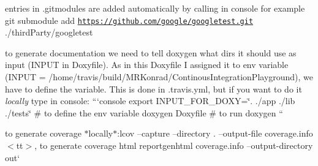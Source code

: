 \begin{DoxyItemize}
\item entries in {\ttfamily .gitmodules} are added automatically by calling in console for example {\ttfamily git submodule add \href{https://github.com/google/googletest.git}{\tt https\-://github.\-com/google/googletest.\-git} ./third\-Party/googletest}
\begin{DoxyItemize}
\item to generate documentation we need to tell doxygen what dirs it should use as input ({\ttfamily I\-N\-P\-U\-T} in Doxyfile). As in this Doxyfile I assigned it to env variable ({\ttfamily I\-N\-P\-U\-T = /home/travis/build/\-M\-R\-Konrad/\-Continous\-Integration\-Playground}), we have to define the variable. This is done in {\ttfamily .travis.\-yml}, but if you want to do it {\itshape locally} type in console\-: ```console export I\-N\-P\-U\-T\-\_\-\-F\-O\-R\-\_\-\-D\-O\-X\-Y=\char`\"{}. ./app ./lib ./tests\char`\"{} \# to define the env variable doxygen Doxyfile \# to run doxygen ``{\ttfamily }
\end{DoxyItemize}
\item {\ttfamily to generate coverage $\ast$locally$\ast$\-:}lcov --capture --directory . --output-\/file coverage.\-info$<$tt$>$, to generate coverage html reportgenhtml coverage.\-info --output-\/directory out` 
\end{DoxyItemize}